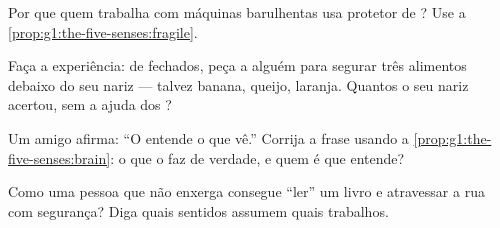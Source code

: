 \begin{exercise}[$\star$]\label{exo:g1:the-five-senses:7}
Por que quem trabalha com máquinas barulhentas usa protetor de
? Use a \cref{prop:g1:the-five-senses:fragile}.
\end{exercise}

\begin{exercise}[$\star$]\label{exo:g1:the-five-senses:8}
Faça a experiência: de  fechados, peça a alguém para segurar
três alimentos debaixo do seu nariz --- talvez banana, queijo,
laranja. Quantos o seu nariz acertou, sem a ajuda dos ?
\end{exercise}

\begin{exercise}[$\star\star$]\label{exo:g1:the-five-senses:9}
Um amigo afirma: ``O  entende o que vê.'' Corrija a frase usando
a \cref{prop:g1:the-five-senses:brain}: o que o  faz de verdade,
e quem é que entende?
\end{exercise}

\begin{exercise}[$\star\star$]\label{exo:g1:the-five-senses:10}
Como uma pessoa que não enxerga consegue ``ler'' um livro e
atravessar a rua com segurança? Diga quais sentidos assumem quais
trabalhos.
\end{exercise}
